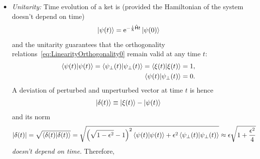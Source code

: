 \documentclass[a4paper,11pt,twoside]{article}
\begin{document}
\begin{itemize}
            \item
                \emph{Unitarity:} Time evolution of a ket is (provided the Hamiltonian of the system doesn't depend on time)
                \begin{equation}
                    \left|{\psi(t)}\right\rangle=\operatorname{e}^{-\frac{\mathrm{i}}{\hbar}\mathsf{\hat{H}}t}\left|{\psi(0)}\right\rangle
                \end{equation}
                and the unitarity guarantees that the orthogonality relations~\eqref{eq:LinearityOrthogonality0} remain valid at any time $t$:
                \begin{align}
                    \left\langle{\psi(t)}\middle|{\psi(t)}\right\rangle=\left\langle{\psi_{\perp}(t)}\middle|{\psi_{\perp}(t)}\right\rangle=\left\langle{\xi(t)}\middle|{\xi(t)}\right\rangle=1,\nonumber\\
                    \label{eq:LinearityOrthogonality}
                    \left\langle{\psi(t)}\middle|{\psi_{\perp}(t)}\right\rangle=0.
                \end{align}
                A deviation of perturbed and unperturbed vector at time $t$ is hence
                \begin{equation}
                    \left|{\delta(t)}\right\rangle\equiv\left|{\xi(t)}\right\rangle-\left|{\psi(t)}\right\rangle
                \end{equation}
                and its norm
                \begin{equation}
                    \left|{\delta(t)}\right|
                        =\sqrt{\left\langle{\delta(t)}\middle|{\delta(t)}\right\rangle}
                        =\sqrt{\left(\sqrt{1-\epsilon^{2}}-1\right)^{2}\left\langle{\psi(t)}\middle|{\psi(t)}\right\rangle+\epsilon^{2}\left\langle{\psi_{\perp}(t)}\middle|{\psi_{\perp}(t)}\right\rangle}
                        \approx\epsilon\sqrt{1+\frac{\epsilon^{2}}{4}}
                \end{equation}
                \emph{doesn't depend on time.}
                Therefore, 
        \end{itemize}
\end{document}

